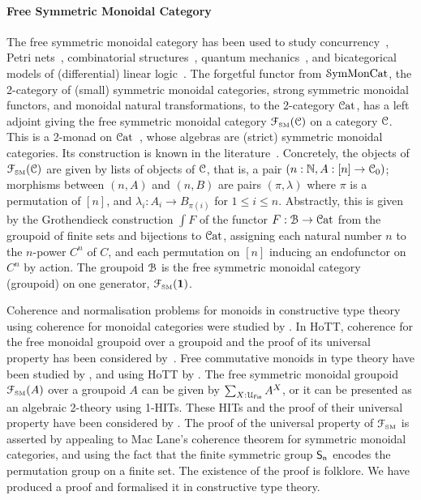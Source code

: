 \paragraph{Free Symmetric Monoidal Category} The free symmetric monoidal category has been used to study
concurrency~\cite{hylandSymmetricMonoidalSketches2004}, Petri nets~\cite{baezCategoriesNets2021}, combinatorial
structures~\cite{fioreCartesianClosedBicategory2008}, quantum mechanics~\cite{abramskyAbstractScalarsLoops2005}, and
bicategorical models of (differential) linear logic~\cite{melliesTemplateGamesDifferential2019}. The forgetful functor
from $\SymMonCat$, the 2-category of (small) symmetric monoidal categories, strong symmetric monoidal functors, and
monoidal natural transformations, to the 2-category $\CatCat$, has a left adjoint giving the free symmetric monoidal
category $\FSM[\CCat{C}]$ on a category $\CCat{C}$. This is a 2-monad on
$\CatCat$~\cite{blackwellTwodimensionalMonadTheory1989}, whose algebras are (strict) symmetric monoidal categories. Its
construction is known in the literature~\cite{abramskyAbstractScalarsLoops2005}.  Concretely, the objects of
$\FSM[\CCat{C}]$ are given by lists of objects of $\CCat{C}$, that is, a pair $(n:\Nat, A:[n] \to \CCat{C}_{0})$;
morphisms between $(n,A)$ and $(n,B)$ are pairs $(\pi,\lambda)$ where $\pi$ is a permutation of $[n]$, and
$\lambda_{i} : A_{i} \to B_{\pi(i)}$ for $1 \leq i \leq n$. Abstractly, this is given by the Grothendieck construction
$\int F$ of the functor $F : \BFin \to \CatCat$ from the groupoid of finite sets and bijections to $\CatCat$, assigning
each natural number $n$ to the $n$-power $C^{n}$ of $C$, and each permutation on $[n]$ inducing an endofunctor on
$C^{n}$ by action. The groupoid $\BFin$ is the free symmetric monoidal category (groupoid) on one generator, $\FSM[\unit]$.

Coherence and normalisation problems for monoids in constructive type theory using coherence for monoidal categories
were studied by \citet{beylinExtractingProofCoherence1996}. In HoTT, coherence for the free monoidal groupoid over a
groupoid and the proof of its universal property has been considered
by~\citet{piceghelloCoherenceMonoidalGroupoids2020}. Free commutative monoids in type theory have been studied by
\citet{gylterudMultisetsTypeTheory2020}, and using HoTT by \citet{choudhuryFinitemultisetConstructionHoTT2019}. The free
symmetric monoidal groupoid $\FSM[A]$ over a groupoid $A$ can be given by $\dsum*{X:\UFin}{A^{X}}$, or it can be
presented as an algebraic 2-theory using 1-HITs. These HITs and the proof of their universal property have been
considered by \citet{piceghelloCoherenceSymmetricMonoidal2019,choudhuryFinitemultisetConstructionHoTT2019}. The proof of
the universal property of $\FSM$ is asserted by appealing to Mac Lane's coherence theorem for symmetric monoidal
categories, and using the fact that the finite symmetric group $\Sn$ encodes the permutation group on a finite set. The
existence of the proof is folklore. We have produced a proof and formalised it in constructive type theory.

